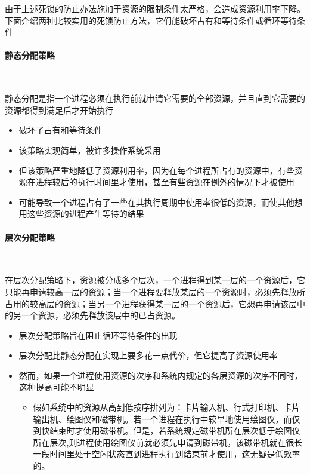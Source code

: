 \documentclass[cs4size,a4paper,10pt]{ctexart}
\begin{document}
	由于上述死锁的防止办法施加于资源的限制条件太严格，会造成资源利用率下降。下面介绍两种比较实用的死锁防止方法，它们能破坏占有和等待条件或循环等待条件

	\paragraph{静态分配策略}~{}

	静态分配是指一个进程必须在执行前就申请它需要的全部资源，并且直到它需要的资源都得到满足后才开始执行
	\begin{itemize}
		\item 破坏了占有和等待条件
		\item 该策略实现简单，被许多操作系统采用
		\item 但该策略严重地降低了资源利用率，因为在每个进程所占有的资源中，有些资源在进程较后的执行时间里才使用，甚至有些资源在例外的情况下才被使用
		\item 可能导致一个进程占有了一些在其执行周期中使用率很低的资源，而使其他想用这些资源的进程产生等待的结果
	\end{itemize}


	\paragraph{层次分配策略}~{}

	在层次分配策略下，资源被分成多个层次，一个进程得到某一层的一个资源后，它只能再申请较高一层的资源；当一个进程要释放某层的一个资源时，必须先释放所占用的较高层的资源；当另一个进程获得某一层的一个资源后，它想再申请该层中的另一个资源，必须先释放该层中的已占资源。
	\begin{itemize}
		\item 层次分配策略旨在阻止循环等待条件的出现
		\item 层次分配比静态分配在实现上要多花一点代价，但它提高了资源使用率
		\item 然而，如果一个进程使用资源的次序和系统内规定的各层资源的次序不同时，这种提高可能不明显
		\begin{itemize}
			\item 假如系统中的资源从高到低按序排列为：卡片输入机、行式打印机、卡片输出机、绘图仪和磁带机。若一个进程在执行中较早地使用绘图仪，而仅到快结束时才使用磁带机。但是，若系统规定磁带机所在层次低于绘图仪所在层次,则进程使用绘图仪前就必须先申请到磁带机，该磁带机就在很长一段时间里处于空闲状态直到进程执行到结束前才使用，这无疑是低效率的。
		\end{itemize}
	\end{itemize}
\end{document}
